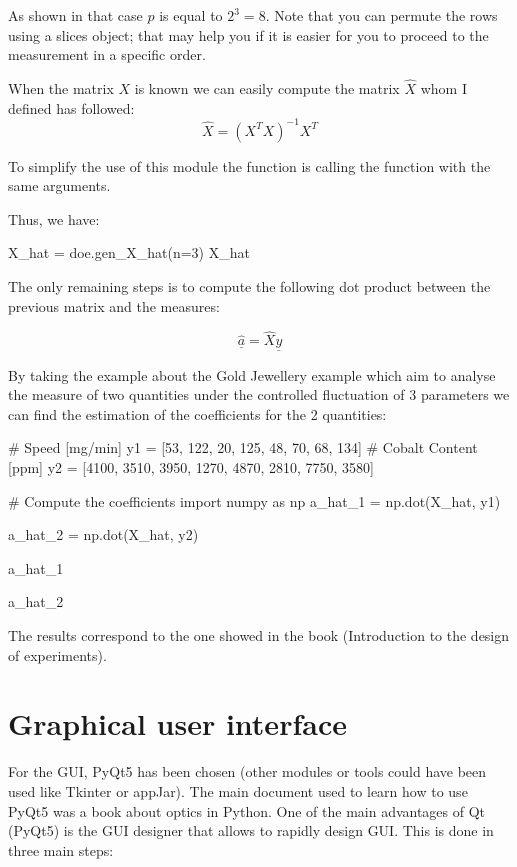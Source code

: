 \documentclass[english, 12 pt, openany, oneside]{book}
\begin{document}
As shown in that case $p$ is equal to $2^3=8$. Note that you can permute the rows using a slices object; that may help you if it is easier for you to proceed to the measurement in a specific order.

When the matrix $X$ is known we can easily compute the matrix $\hat{X}$ whom I defined has followed:
\begin{equation*}
\hat{X} = \left(X^T X\right)^{-1} X^T
\end{equation*}

To simplify the use of this module the function  is calling the function  with the same arguments.

Thus, we have:
\begin{pyconsole}[][breaklines]
X_hat  = doe.gen_X_hat(n=3)
X_hat
\end{pyconsole}

The only remaining steps is to compute the following dot product between the previous matrix and the measures:

\begin{equation*}
\hat{\underline{a}} = \hat{X} \underline{y}
\end{equation*}

By taking the example about the Gold Jewellery\cite{goupy_introduction_2007} example which aim to analyse the measure of two quantities under the controlled fluctuation of 3 parameters we can find the estimation of the coefficients for the 2 quantities:

\begin{pyconsole}[][breaklines]
# Speed [mg/min]
y1 = [53, 122, 20, 125, 48, 70, 68, 134]
# Cobalt Content [ppm]
y2 = [4100, 3510, 3950, 1270, 4870, 2810, 7750, 3580]

# Compute the coefficients
import numpy as np
a_hat_1 = np.dot(X_hat, y1)

a_hat_2 = np.dot(X_hat, y2)

a_hat_1

a_hat_2
\end{pyconsole}

The results correspond to the one showed in the book (Introduction to the design of experiments).

\section{Graphical user interface}
For the GUI, PyQt5 has been chosen (other modules or tools could have been used like Tkinter or appJar). The main document used to learn how to use PyQt5 was a book about optics in Python\cite{lakshminarayanan_understanding_2018}. One of the main advantages of Qt (PyQt5) is the GUI designer that allows to rapidly design GUI. This is done in three main steps:
\end{document}
